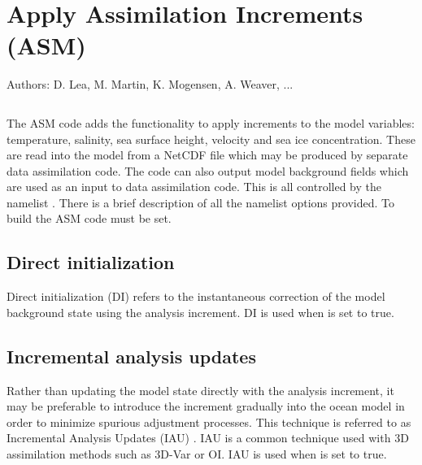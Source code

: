\documentclass[../tex_main/NEMO_manual]{subfiles}
\begin{document}
\chapter{Apply Assimilation Increments (ASM)}
\label{chap:ASM}

Authors: D. Lea,  M. Martin, K. Mogensen, A. Weaver, ...   %

\minitoc


\newpage
$\ $\newline    %

The ASM code adds the functionality to apply increments to the model variables: 
temperature, salinity, sea surface height, velocity and sea ice concentration. 
These are read into the model from a NetCDF file which may be produced by separate data
assimilation code.  The code can also output model background fields which are used
as an input to data assimilation code. This is all controlled by the namelist
\textit{ }.  There is a brief description of all the namelist options
provided.  To build the ASM code  must be set.


\section{Direct initialization}
\label{sec:ASM_DI}

Direct initialization (DI) refers to the instantaneous correction
of the model background state using the analysis increment.
DI is used when  is set to true.

\section{Incremental analysis updates}
\label{sec:ASM_IAU}

Rather than updating the model state directly with the analysis increment,
it may be preferable to introduce the increment gradually into the ocean
model in order to minimize spurious adjustment processes. This technique
is referred to as Incremental Analysis Updates (IAU) \citep{Bloom_al_MWR96}.
IAU is a common technique used with 3D assimilation methods such as 3D-Var or OI.
IAU is used when  is set to true.
\end{document}
